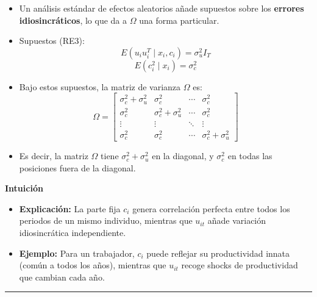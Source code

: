 \documentclass[12pt]{article}
\begin{document}
\begin{itemize}
    \item Un análisis estándar de efectos aleatorios añade supuestos sobre los \textbf{errores idiosincráticos}, lo que da a $\Omega$ una forma particular.
    
    \item Supuestos (RE3):
    \[
    E(u_i u_i^T \mid x_i, c_i) = \sigma_u^2 I_T
    \]
    \[
    E(c_i^2 \mid x_i) = \sigma_c^2
    \]
    
    \item Bajo estos supuestos, la matriz de varianza $\Omega$ es:
    \[
    \Omega =
    \begin{bmatrix}
    \sigma_c^2 + \sigma_u^2 & \sigma_c^2 & \cdots & \sigma_c^2 \\
    \sigma_c^2 & \sigma_c^2 + \sigma_u^2 & \cdots & \sigma_c^2 \\
    \vdots & \vdots & \ddots & \vdots \\
    \sigma_c^2 & \sigma_c^2 & \cdots & \sigma_c^2 + \sigma_u^2
    \end{bmatrix}
    \]
    
    \item Es decir, la matriz $\Omega$ tiene $\sigma_c^2 + \sigma_u^2$ en la diagonal, y $\sigma_c^2$ en todas las posiciones fuera de la diagonal.
\end{itemize}

\noindent\textbf{Intuición}
\begin{itemize}
    \item \textbf{Explicación:} La parte fija $c_i$ genera correlación perfecta entre todos los periodos de un mismo individuo, mientras que $u_{it}$ añade variación idiosincrática independiente.
    \item \textbf{Ejemplo:} Para un trabajador, $c_i$ puede reflejar su productividad innata (común a todos los años), mientras que $u_{it}$ recoge shocks de productividad que cambian cada año.
\end{itemize}

\hrule
\end{document}

